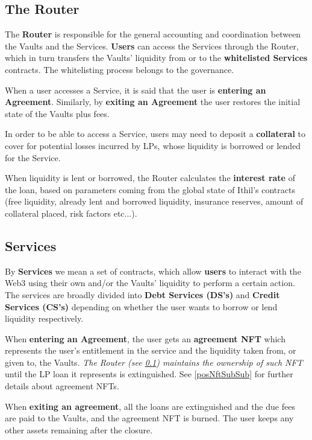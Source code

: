 \documentclass[a4paper,10 pt]{article}
\theoremstyle{definition}
\begin{document}
\subsection{The Router}\label{routerSub}

The {\bf Router} is responsible for the general accounting and coordination between the Vaults and the Services. {\bf Users} can access the Services through the Router, which in turn transfers the Vaults' liquidity from or to the {\bf whitelisted Services} contracts. The whitelisting process belongs to the governance.

When a user accesses a Service, it is said that the user is {\bf entering an Agreement}. Similarly, by {\bf exiting an Agreement} the user restores the initial state of the Vaults plus fees.

In order to be able to access a Service, users may need to deposit a {\bf collateral} to cover for potential losses incurred by LPs, whose liquidity is borrowed or lended for the Service.

When liquidity is lent or borrowed, the Router calculates the {\bf interest rate} of the loan, based on parameters coming from the global state of Ithil's contracts (free liquidity, already lent and borrowed liquidity, insurance reserves, amount of collateral placed, risk factors etc...).

\subsection{Services}\label{servicesSub}

By {\bf Services} we mean a set of contracts, which allow {\bf users} to interact with the Web3 using their own and/or the Vaults' liquidity to perform a certain action. The services are broadly divided into {\bf Debt Services (DS's)} and {\bf Credit Services (CS's)} depending on whether the user wants to borrow or lend liquidity respectively.

When {\bf entering an Agreement}, the user gets an {\bf agreement NFT} which represents the user's entitlement in the service and the liquidity taken from, or given to, the Vaults. {\it The Router (see \ref{routerSub}) maintains the ownership of such NFT} until the LP loan it represents is extinguished. See \ref{posNftSubSub} for further details about agreement NFTs.

When {\bf exiting an agreement}, all the loans are extinguished and the due fees are paid to the Vaults, and the agreement NFT is burned. The user keeps any other assets remaining after the closure.
\end{document}
